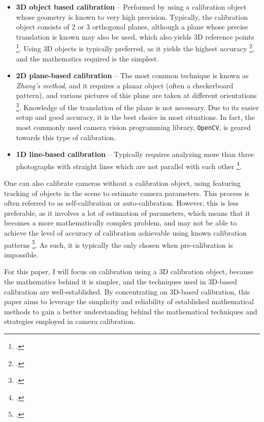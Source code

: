 \begin{itemize}[leftmargin=!, itemindent=-4ex]
    \item \textbf{3D object based calibration} -- Performed by using a calibration object whose geometry is known to very high precision. Typically, the calibration object consists of 2 or 3 orthogonal planes, although a plane whose precise translation is known may also be used, which also yields 3D reference points \footcite{zhangCameraCalibration2007}. Using 3D objects is typically preferred, as it yields the highest accuracy \footcite{zhangCameraCalibration2007}, and the mathematics required is the simplest.
    \item \textbf{2D plane-based calibration} -- The most common technique is known as \emph{Zhang's method}, and it requires a planar object (often a checkerboard pattern), and various pictures of this plane are taken at different orientations \footcite{zhangFlexibleNew2000}. Knowledge of the translation of the plane is not necessary. Due to its easier setup and good accuracy, it is the best choice in most situations. In fact, the most commonly used camera vision programming library, \texttt{OpenCV}, is geared towards this type of calibration. 
    \item \textbf{1D line-based calibration} -- Typically requires analyzing more than three photographs with straight lines which are not parallel with each other \footcite{chuLineBasedCamera2005}. 
\end{itemize}

One can also calibrate cameras without a calibration object, using featuring tracking of objects in the scene to estimate camera parameters. This process is often referred to as self-calibration or auto-calibration. However, this is less preferable, as it involves a lot of estimation of parameters, which means that it becomes a more mathematically complex problem, and may not be able to achieve the level of accuracy of calibration achievable using known calibration patterns \footcite{zhangCameraCalibration2007}. As such, it is typically the only chosen when pre-calibration is impossible. 

For this paper, I will focus on calibration using a 3D calibration object, because the mathematics behind it is simpler, and the techniques used in 3D-based calibration are well-established. By concentrating on 3D-based calibration, this paper aims to leverage the simplicity and reliability of established mathematical methods to gain a better understanding behind the mathematical techniques and strategies employed in camera calibration.

